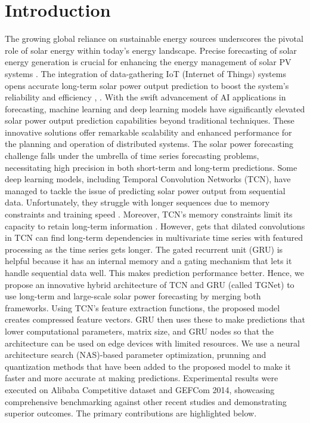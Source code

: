 \documentclass[sn-mathphys-num]{sn-jnl}%
\begin{document}
\section{Introduction}\label{sec1}
The growing global reliance on sustainable energy sources underscores the pivotal role of solar energy within today's energy landscape. Precise forecasting of solar energy generation is crucial for enhancing the energy management of solar PV systems \cite{venkatesan2024integrating}. The integration of data-gathering IoT (Internet of Things) systems opens accurate long-term solar power output prediction to boost the system's reliability and efficiency \cite{kazmi2023iot}, \cite{feng2022multi}. With the swift advancement of AI applications in forecasting, machine learning and deep learning models have significantly elevated solar power output prediction capabilities beyond traditional techniques. These innovative solutions offer remarkable scalability and enhanced performance for the planning and operation of distributed systems\cite{hu2024short}. The solar power forecasting challenge falls under the umbrella of time series forecasting problems, necessitating high precision in both short-term and long-term predictions. Some deep learning models, including Temporal Convolution Networks (TCN), have managed to tackle the issue of predicting solar power output from sequential data. Unfortunately, they struggle with longer sequences due to memory constraints and training speed \cite{cheng2024solar}. Moreover, TCN’s memory constraints limit its capacity to retain long-term information \cite{ferkous2024novel}. However, \cite{tamil2023solar} gets that dilated convolutions in TCN can find long-term dependencies in multivariate time series with featured processing as the time series gets longer. The gated recurrent unit (GRU) is helpful because it has an internal memory and a gating mechanism that lets it handle sequential data well. This makes prediction performance better. Hence, we propose an innovative hybrid architecture of TCN and GRU (called TGNet) to use long-term and large-scale solar power forecasting by merging both frameworks. Using TCN's feature extraction functions, the proposed model creates compressed feature vectors. GRU then uses these to make predictions that lower computational parameters, matrix size, and GRU nodes so that the architecture can be used on edge devices with limited resources. We use a neural architecture search (NAS)-based parameter optimization, prunning and quantization methods that have been added to the proposed model to make it faster and more accurate at making predictions. Experimental results were executed on Alibaba Competitive dataset and GEFCom 2014, showcasing comprehensive benchmarking against other recent studies and demonstrating superior outcomes. The primary contributions are highlighted below.
\end{document}
